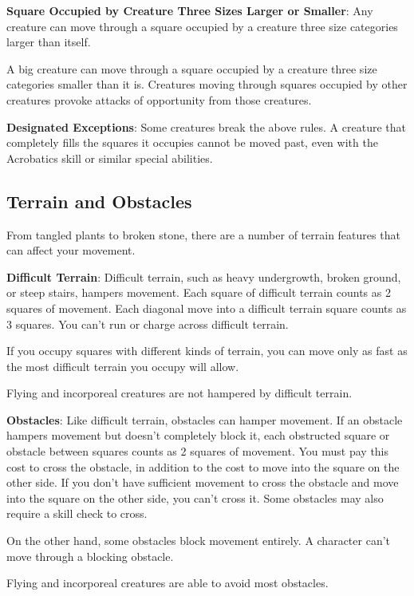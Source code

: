 \textbf{Square Occupied by Creature Three Sizes Larger or Smaller}: Any creature can move through a square occupied by a creature three size categories larger than itself.
				
A big creature can move through a square occupied by a creature three size categories smaller than it is. Creatures moving through squares occupied by other creatures provoke attacks of opportunity from those creatures.
				
\textbf{Designated Exceptions}: Some creatures break the above rules. A creature that completely fills the squares it occupies cannot be moved past, even with the Acrobatics skill or similar special abilities.
				
\subsection{Terrain and Obstacles}

				
From tangled plants to broken stone, there are a number of terrain features that can affect your movement.
				
\textbf{Difficult Terrain}: Difficult terrain, such as heavy undergrowth, broken ground, or steep stairs, hampers movement. Each square of difficult terrain counts as 2 squares of movement. Each diagonal move into a difficult terrain square counts as 3 squares. You can't run or charge across difficult terrain.
				
If you occupy squares with different kinds of terrain, you can move only as fast as the most difficult terrain you occupy will allow.
				
Flying and incorporeal creatures are not hampered by difficult terrain.
				
\textbf{Obstacles}: Like difficult terrain, obstacles can hamper movement. If an obstacle hampers movement but doesn't completely block it, each obstructed square or obstacle between squares counts as 2 squares of movement. You must pay this cost to cross the obstacle, in addition to the cost to move into the square on the other side. If you don't have sufficient movement to cross the obstacle and move into the square on the other side, you can't cross it. Some obstacles may also require a skill check to cross.
				
On the other hand, some obstacles block movement entirely. A character can't move through a blocking obstacle.
				
Flying and incorporeal creatures are able to avoid most obstacles.
				
